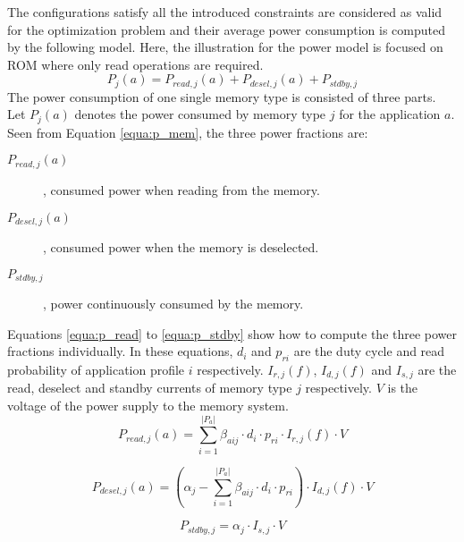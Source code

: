 	The configurations satisfy all the introduced constraints are considered
	as valid for the optimization problem and their average power consumption
	is computed by the following model. Here, the illustration for the power model
	is focused on ROM where only read operations are required.
	\begin{equation}
	\label{equa:p_mem}
		P_{j}\left( a \right) =
		P_{read,j}\left( a \right) +
		P_{desel,j}\left( a \right) +
		P_{stdby,j}
	\end{equation}
	The power consumption of one single memory type is consisted of three parts.
	Let $P_{j} \left( a \right) $ denotes the power consumed by memory type $j$
	for the application $a$. Seen from Equation \ref{equa:p_mem}, the three power
	fractions are:
	\begin{description}
		\item[$P_{read,j} \left( a \right) $]
			, consumed power when reading from the memory.
		\item[$P_{desel,j} \left( a \right) $]
			, consumed power when the memory is deselected.
		\item[$P_{stdby,j}$]
			, power continuously consumed by the memory.
	\end{description}
	Equations \ref{equa:p_read} to \ref{equa:p_stdby} show how to compute
	the three power fractions individually. In these equations,
	$d_{i}$ and $p_{ri}$ are the duty cycle and read probability of application
	profile $i$ respectively.
	$I_{r,j}\left( f \right)$, $I_{d,j}\left( f \right)$ and $I_{s,j}$
	are the read, deselect and standby currents of memory type $j$ respectively.
	$V$ is the voltage of the power supply to the memory system.
	\begin{equation}
	\label{equa:p_read}
		P_{read,j}\left( a \right) = 
		\sum_{i=1}^{\lvert P_{a} \rvert} \beta_{aij}
		\cdot d_{i} \cdot p_{ri}
		\cdot I_{r,j}\left( f \right) \cdot V
	\end{equation}
			
	\begin{equation}
	\label{equa:p_desel}
		P_{desel,j}\left( a \right) =
		\left( \alpha_{j} - 
		\sum_{i=1}^{\lvert P_{a} \rvert} \beta_{aij}
		\cdot d_{i} \cdot p_{ri}
		\right)
		\cdot I_{d,j}\left( f \right) \cdot V
	\end{equation}

	\begin{equation}
	\label{equa:p_stdby}
		P_{stdby,j} =
		\alpha_{j} \cdot I_{s,j} \cdot V
	\end{equation}		

